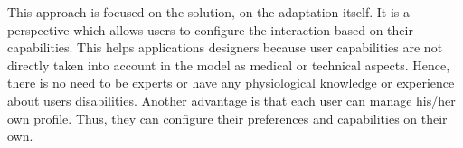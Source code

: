 This approach is focused on the solution, on the adaptation itself. It is a 
perspective which allows users to configure the interaction based on their 
capabilities. This helps applications designers because user capabilities are 
not directly taken into account in the model as medical or technical aspects. 
Hence, there is no need to be experts or have any physiological knowledge or 
experience about users disabilities. Another advantage is that each user can 
manage his/her own profile. Thus, they can configure their preferences and 
capabilities on their own. 